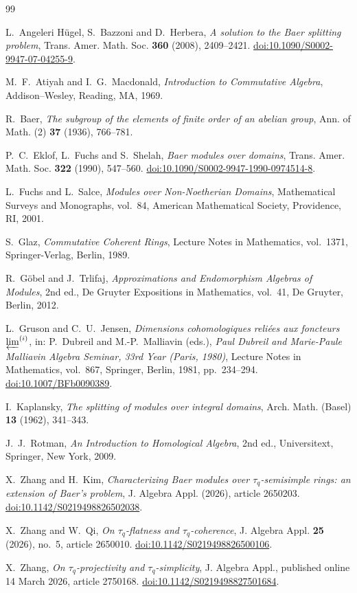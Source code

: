 \documentclass[11pt]{article}
\theoremstyle{definition}
\theoremstyle{remark}
\begin{document}
\begin{thebibliography}{99}

L.~Angeleri H\"ugel, S.~Bazzoni and D.~Herbera,
\emph{A solution to the Baer splitting problem},
Trans. Amer. Math. Soc. \textbf{360} (2008), 2409--2421.
\href{https://doi.org/10.1090/S0002-9947-07-04255-9}{doi:10.1090/S0002-9947-07-04255-9}.

M.~F.~Atiyah and I.~G.~Macdonald,
\emph{Introduction to Commutative Algebra},
Addison--Wesley, Reading, MA, 1969.

R.~Baer,
\emph{The subgroup of the elements of finite order of an abelian group},
Ann. of Math. (2) \textbf{37} (1936), 766--781.

P.~C.~Eklof, L.~Fuchs and S.~Shelah,
\emph{Baer modules over domains},
Trans. Amer. Math. Soc. \textbf{322} (1990), 547--560.
\href{https://doi.org/10.1090/S0002-9947-1990-0974514-8}{doi:10.1090/S0002-9947-1990-0974514-8}.

L.~Fuchs and L.~Salce,
\emph{Modules over Non-Noetherian Domains},
Mathematical Surveys and Monographs, vol.~84,
American Mathematical Society, Providence, RI, 2001.

S.~Glaz,
\emph{Commutative Coherent Rings},
Lecture Notes in Mathematics, vol.~1371,
Springer-Verlag, Berlin, 1989.

R.~G\"obel and J.~Trlifaj,
\emph{Approximations and Endomorphism Algebras of Modules}, 2nd ed.,
De Gruyter Expositions in Mathematics, vol.~41,
De Gruyter, Berlin, 2012.

L.~Gruson and C.~U.~Jensen,
\emph{Dimensions cohomologiques reli\'ees aux foncteurs
$\varprojlim^{(i)}$},
in: P.~Dubreil and M.-P.~Malliavin (eds.),
\emph{Paul Dubreil and Marie-Paule Malliavin Algebra Seminar, 33rd Year
(Paris, 1980)}, Lecture Notes in Mathematics, vol.~867,
Springer, Berlin, 1981, pp.~234--294.
\href{https://doi.org/10.1007/BFb0090389}{doi:10.1007/BFb0090389}.

I.~Kaplansky,
\emph{The splitting of modules over integral domains},
Arch. Math. (Basel) \textbf{13} (1962), 341--343.

J.~J.~Rotman,
\emph{An Introduction to Homological Algebra}, 2nd ed.,
Universitext, Springer, New York, 2009.

X.~Zhang and H.~Kim,
\emph{Characterizing Baer modules over $\tau_q$-semisimple rings: an extension of Baer's problem},
J. Algebra Appl. (2026), article 2650203.
\href{https://doi.org/10.1142/S0219498826502038}{doi:10.1142/S0219498826502038}.

X.~Zhang and W.~Qi,
\emph{On $\tau_q$-flatness and $\tau_q$-coherence},
J. Algebra Appl. \textbf{25} (2026), no.~5, article 2650010.
\href{https://doi.org/10.1142/S0219498826500106}{doi:10.1142/S0219498826500106}.

X.~Zhang,
\emph{On $\tau_q$-projectivity and $\tau_q$-simplicity},
J. Algebra Appl., published online 14 March 2026, article 2750168.
\href{https://doi.org/10.1142/S0219498827501684}{doi:10.1142/S0219498827501684}.

\end{thebibliography}
\end{document}
